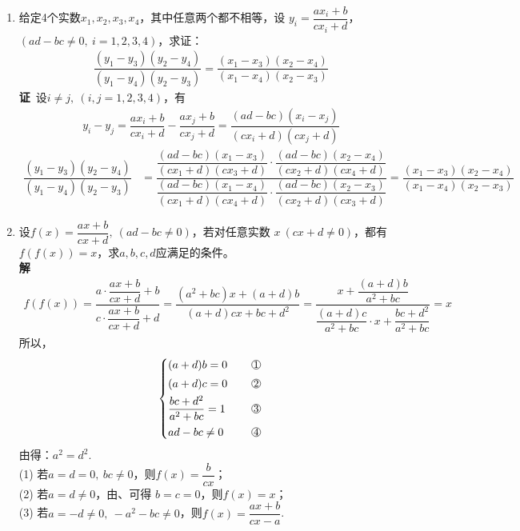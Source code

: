 \begin{enumerate}[label={【\textbf{例\thechapter.\arabic*}】},
 leftmargin=\inteval{\myenumleftmargin}pt,
 itemsep=\inteval{\myenumitempsep}pt,
 itemindent=\inteval{\myenumitemindent}pt]
\item \label{分式线性变换保交比例题}
给定4个实数$ x_1,x_2,x_3,x_4 $，其中任意两个都不相等，设
$ y_i=\dfrac{ax_i+b}{cx_i+d} $，$ (ad-bc\neq 0,\ i=1,2,3,4) $，求证：
\begin{gather}\label{分式线性变换保交比}
    \dfrac{(y_1-y_3)(y_2-y_4)}{(y_1-y_4)(y_2-y_3)}=
    \dfrac{(x_1-x_3)(x_2-x_4)}{(x_1-x_4)(x_2-x_3)}
\end{gather}
\textbf{证}\ 设$ i\neq j,\ (i,j=1,2,3,4) $，有
\begin{gather*}
    y_i-y_j=\dfrac{ax_i+b}{cx_i+d}-\dfrac{ax_j+b}{cx_j+d}=
    \dfrac{(ad-bc)(x_i-x_j)}{(cx_i+d)(cx_j+d)}
\end{gather*}
\begin{align*}
    \dfrac{(y_1-y_3)(y_2-y_4)}{(y_1-y_4)(y_2-y_3)} &=
    \dfrac{\dfrac{(ad-bc)(x_1-x_3)}{(cx_1+d)(cx_3+d)}\cdot
        \dfrac{(ad-bc)(x_2-x_4)}{(cx_2+d)(cx_4+d)}}{
        \dfrac{(ad-bc)(x_1-x_4)}{(cx_1+d)(cx_4+d)}\cdot
        \dfrac{(ad-bc)(x_2-x_3)}{(cx_2+d)(cx_3+d)} }
    =\dfrac{(x_1-x_3)(x_2-x_4)}{(x_1-x_4)(x_2-x_3)}
\end{align*}

\item 设$ f(x)=\dfrac{ax+b}{cx+d},\ (ad-bc\neq 0) $，若对任意实数
$ x\ (cx+d\neq 0) $，都有$ f(f(x))=x $，求$ a,b,c,d $应满足的条件。\\
\textbf{解}\ 
\begin{gather*}
    f(f(x))=\dfrac{a\cdot\dfrac{ax+b}{cx+d}+b}{c\cdot
        \dfrac{ax+b}{cx+d}+d}=
    \dfrac{(a^2+bc)x+(a+d)b}{(a+d)cx+bc+d^2}=
    \dfrac{x+\dfrac{(a+d)b}{a^2+bc}}{\dfrac{(a+d)c}{a^2+bc}
        \cdot x+ \dfrac{bc+d^2}{a^2+bc}}=x
\end{gather*}
所以，
\begin{align*}
    \begin{dcases}
        (a+d)b=0\q  & \mycircled{1} \\
        (a+d)c=0\q  & \mycircled{2} \\
        \dfrac{bc+d^2}{a^2+bc}=1\q  & \mycircled{3} \\
        ad-bc\neq 0\q  & \mycircled{4}
    \end{dcases}
\end{align*}
由得：$ a^2=d^2 $. \\
(1) 若$ a=d=0,\ bc\neq 0 $，则$ f(x)=\dfrac{b}{cx} $；\\
(2) 若$ a=d\neq 0 $，由、可得
$ b=c=0 $，则$ f(x)=x $；\\
(3) 若$ a=-d\neq 0,\ -a^2-bc\neq 0 $，则$ f(x)=\dfrac{ax+b}{cx-a} $.


\end{enumerate}
